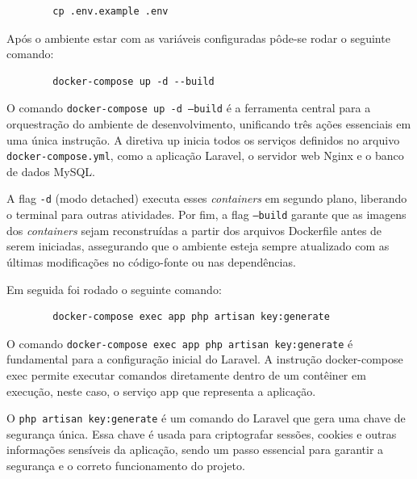         \begin{verbatim}
        cp .env.example .env
        \end{verbatim}

        \par Após o ambiente estar com as variáveis configuradas pôde-se rodar o seguinte comando:

        \begin{verbatim}
        docker-compose up -d --build
        \end{verbatim}

        \par O comando \texttt{docker-compose up -d --build} é a ferramenta central para a orquestração do ambiente de desenvolvimento, unificando três ações essenciais em uma única instrução. A diretiva up inicia todos os serviços definidos no arquivo \texttt{docker-compose.yml}, como a aplicação Laravel, o servidor web Nginx e o banco de dados MySQL. 
        
        \par A flag \texttt{-d} (modo detached) executa esses \textit{containers} em segundo plano, liberando o terminal para outras atividades. Por fim, a flag \texttt{--build} garante que as imagens dos \textit{containers} sejam reconstruídas a partir dos arquivos Dockerfile antes de serem iniciadas, assegurando que o ambiente esteja sempre atualizado com as últimas modificações no código-fonte ou nas dependências.

        \par Em seguida foi rodado o seguinte comando:

        \begin{verbatim}
        docker-compose exec app php artisan key:generate
        \end{verbatim}

        \par O comando \texttt{docker-compose exec app php artisan key:generate} é fundamental para a configuração inicial do Laravel. A instrução docker-compose exec permite executar comandos diretamente dentro de um contêiner em execução, neste caso, o serviço app que representa a aplicação.
        
        \par O \texttt{php artisan key:generate} é um comando do Laravel que gera uma chave de segurança única. Essa chave é usada para criptografar sessões, cookies e outras informações sensíveis da aplicação, sendo um passo essencial para garantir a segurança e o correto funcionamento do projeto.

